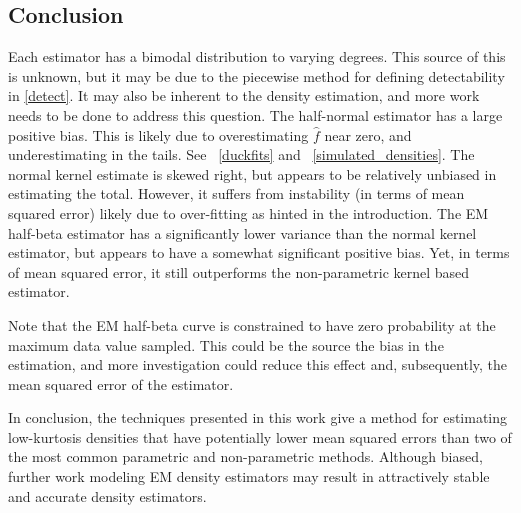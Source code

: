 \documentclass[12pt]{amsart}
\newcommand{\figref}[1]{\figurename~\ref{#1}}
\renewcommand{\hat}{\widehat}
\begin{document}
\begin{multicols}{2}
\section{Conclusion}
Each estimator has a bimodal distribution to varying degrees.
This source of this is unknown, but it may be due to the piecewise method for defining detectability in \eqref{detect}.  
It may also be inherent to the density estimation, and more work needs to be done to address this question.
The half-normal estimator has a large positive bias. %
This is likely due to overestimating $\hat f$ near zero, and underestimating in the tails. 
See \figref{duckfits} and \figref{simulated_densities}.
The normal kernel estimate is skewed right, but appears to be relatively unbiased in estimating the total.  
However, it suffers from instability (in terms of mean squared error) likely due to over-fitting as hinted in the introduction.
The EM half-beta estimator has a significantly lower variance than the normal kernel estimator, but appears to have a somewhat significant positive bias.  
Yet, in terms of mean squared error, it still outperforms the non-parametric kernel based estimator.

Note that the EM half-beta curve is constrained to have zero probability at the maximum data value sampled. 
This could be the source the bias in the estimation, and more investigation could reduce this effect and, subsequently, the mean squared error of the estimator.  

In conclusion, the techniques presented in this work give a method for estimating low-kurtosis densities that have potentially lower mean squared errors than two of the most common parametric and non-parametric methods. 
Although biased, further work modeling EM density estimators may result in attractively stable and accurate density estimators.
\end{multicols}
\end{document}
